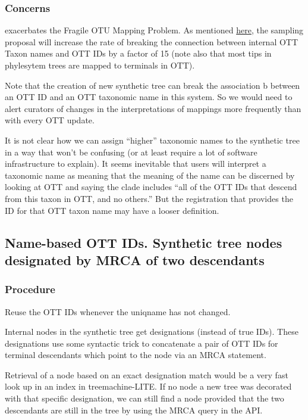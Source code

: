 \documentclass[11pt]{article}
\newcommand{\fragileOTUMapping}{Fragile OTU Mapping Problem\xspace}
\begin{document}
\subsubsection{Concerns}
\begin{compactenum}
  \item exacerbates the \fragileOTUMapping.
  As mentioned \href{https://docs.google.com/document/d/1hJHjMckLywnoBuY1xG3I0hP-rsl4l8du3iA8kflEOQE/edit?pli=1#heading=h.aqib3hn3t8nx}{here},
  the sampling proposal will increase the rate of breaking the connection
  between internal OTT Taxon names and OTT IDs by a factor of 15 (note also that
  most tips in phylesytem trees are mapped to terminals in OTT).
  \item Note that the creation of new synthetic tree can break the association b
  between an OTT ID and an OTT taxonomic name in this system.
  So we would need to alert curators of changes in the interpretations of 
  mappings more frequently than with every OTT update.
  \item It is not clear how we can assign ``higher'' taxonomic names to the 
  synthetic tree in a way that won't be confusing (or at least require a lot
  of software infrastructure to explain).
  It seems inevitable that users will interpret a taxonomic name as meaning
  that the meaning of the name can be discerned by looking at OTT and saying
  the clade includes ``all of the OTT IDs that descend from this taxon in OTT, 
  and no others.''
  But the registration that provides the ID for that OTT taxon name may have a
    looser definition.
\end{compactenum}

\subsection{Name-based OTT IDs. Synthetic tree nodes designated by MRCA of two descendants}
\subsubsection{Procedure}
Reuse the OTT IDs whenever the uniqname has not changed.

Internal nodes in the synthetic tree get designations (instead of true IDs).
These designations use some syntactic trick to concatenate
  a pair of OTT IDs for terminal descendants which point to the node via an MRCA statement.

Retrieval of a node based on an exact designation match would be a very fast look up
  in an index in treemachine-LITE.
If no node a new tree was decorated with that specific designation, we can still
  find a node provided that the two descendants are still in the tree by using
  the MRCA query in the API.
\end{document}
